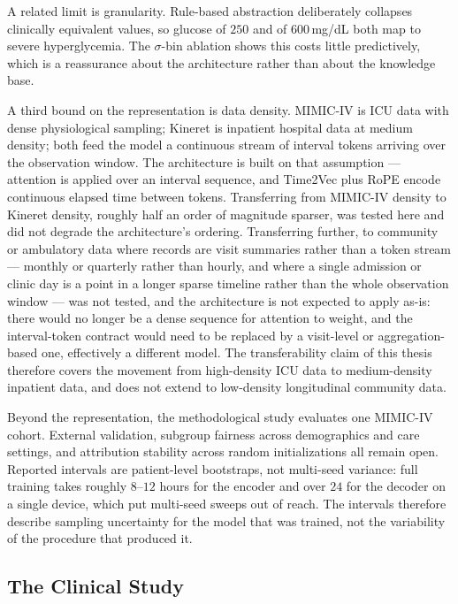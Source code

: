 A related limit is granularity. Rule-based abstraction deliberately collapses clinically equivalent values, so glucose of $250$ and of $600$\,mg/dL both map to severe hyperglycemia. The $\sigma$-bin ablation shows this costs little predictively, which is a reassurance about the architecture rather than about the knowledge base.

A third bound on the representation is data density. MIMIC-IV is ICU data with dense physiological sampling; Kineret is inpatient hospital data at medium density; both feed the model a continuous stream of interval tokens arriving over the observation window. The architecture is built on that assumption --- attention is applied over an interval sequence, and Time2Vec plus RoPE encode continuous elapsed time between tokens. Transferring from MIMIC-IV density to Kineret density, roughly half an order of magnitude sparser, was tested here and did not degrade the architecture's ordering. Transferring further, to community or ambulatory data where records are visit summaries rather than a token stream --- monthly or quarterly rather than hourly, and where a single admission or clinic day is a point in a longer sparse timeline rather than the whole observation window --- was not tested, and the architecture is not expected to apply as-is: there would no longer be a dense sequence for attention to weight, and the interval-token contract would need to be replaced by a visit-level or aggregation-based one, effectively a different model. The transferability claim of this thesis therefore covers the movement from high-density ICU data to medium-density inpatient data, and does not extend to low-density longitudinal community data.

Beyond the representation, the methodological study evaluates one MIMIC-IV cohort. External validation, subgroup fairness across demographics and care settings, and attribution stability across random initializations all remain open. Reported intervals are patient-level bootstraps, not multi-seed variance: full training takes roughly $8$--$12$ hours for the encoder and over $24$ for the decoder on a single device, which put multi-seed sweeps out of reach. The intervals therefore describe sampling uncertainty for the model that was trained, not the variability of the procedure that produced it.

\subsection{The Clinical Study}

